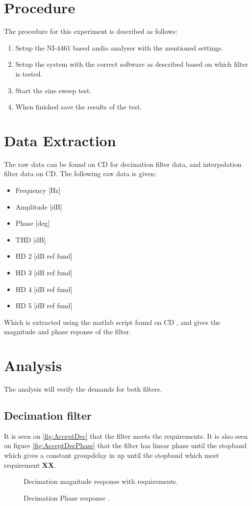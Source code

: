 \section{Procedure}
The procedure for this experiment is described as follows:
\vspace{-5mm}
\begin{enumerate}
\item Setup the NI-4461 based audio analyser with the mentioned settings.
\item Setup the system with the correct software as described based on which filter is tested.
\item Start the sine sweep test.
\item When finished save the results of the test.
\end{enumerate}

\section{Data Extraction}
The raw data can be found on CD for decimation filter data, and interpolation filter data on CD.  The following raw data is given:
\begin{itemize}
\item Frequency [Hz]
\item Amplitude [dB]
\item Phase 	[deg]
\item THD 		[dB]
\item HD 2 		[dB ref fund]
\item HD 3		[dB ref fund]
\item HD 4      [dB ref fund]
\item HD 5      [dB ref fund]
\end{itemize} 
Which is extracted using the matlab script found on CD , and gives the magnitude and phase reponse of the filter.
\section{Analysis}
The analysis will verify the demands for both filters.

\subsection*{Decimation filter}
It is seen on \autoref{fig:AcceptDec} that the filter meets the requirements. It is also seen on figure \autoref{fig:AcceptDecPhase} that the filter has linear phase until the stopband which gives a constant groupdelay in up until the stopband which meet requirement \textbf{XX}. 
\begin{figure}[H]
	\centering
	
	\caption{Decimation magnitude response with requirements.}
	\label{fig:acceptDecMag}
\end{figure}
\begin{figure}[H]
	\centering
	
	\caption{Decimation Phase response .}
	\label{fig:AcceptDecPhase}
\end{figure}



